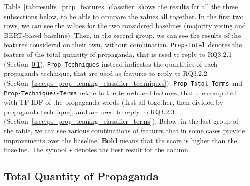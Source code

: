 Table~\ref{tab:results_prop_features_classifier} shows the results for all the three subsections below, to be able to compare the values all together.
In the first two rows, we can see the values for the two considered baselines (majority voting and BERT-based baseline).
Then, in the second group, we can see the results of the features considered on their own, without combination.
\texttt{Prop-Total} denotes the feature of the total quantity of propaganda, that is used to reply to RQ3.2.1 (Section~\ref{ssec:ps_prop_leaning_classifier_total}).
\texttt{Prop-Techniques} instead indicates the quantities of each propaganda technique, that are used as features to reply to RQ3.2.2 (Section~\ref{ssec:ps_prop_leaning_classifier_techniques}).
\texttt{Prop-Total-Terms} and \texttt{Prop-Techniques-Terms} relate to the term-based features, that are computed with TF-IDF of the propaganda words (first all together, then divided by propaganda technique), and are used to reply to RQ3.2.3 (Section~\ref{ssec:ps_prop_leaning_classifier_terms}).
Below, in the last group of the table, we can see various combinations of features that in some cases provide improvements over the baseline. \textbf{Bold} means that the score is higher than the baseline. The symbol $\star$ denotes the best result for the column.

\subsection{Total Quantity of Propaganda}
\label{ssec:ps_prop_leaning_classifier_total}


